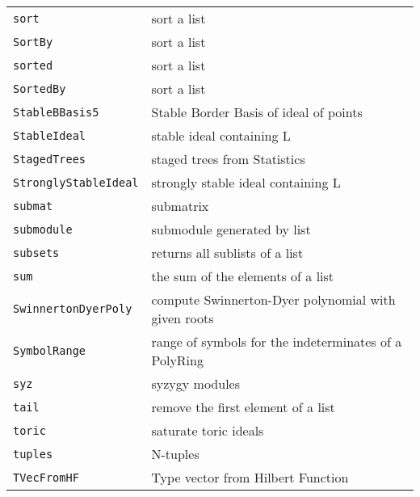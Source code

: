 \documentclass[a4paper]{mybook}
\begin{document}
\begin{center}
\begin{longtable}{ll}
{\verb~sort~} &
      sort a list\\
   
{\verb~SortBy~} &
      sort a list\\
   
{\verb~sorted~} &
      sort a list\\
   
{\verb~SortedBy~} &
      sort a list\\
   
{\verb~StableBBasis5~} &
      Stable Border Basis of ideal of points\\
   
{\verb~StableIdeal~} &
      stable ideal containing L\\
   
{\verb~StagedTrees~} &
      staged trees from Statistics\\
   
{\verb~StronglyStableIdeal~} &
      strongly stable ideal containing L\\
   
{\verb~submat~} &
      submatrix\\
   
{\verb~submodule~} &
      submodule generated by list\\
   
{\verb~subsets~} &
      returns all sublists of a list\\
   
{\verb~sum~} &
      the sum of the elements of a list\\
   
{\verb~SwinnertonDyerPoly~} &
      compute Swinnerton-Dyer polynomial with given roots\\
   
{\verb~SymbolRange~} &
      range of symbols for the indeterminates of a PolyRing\\
   
{\verb~syz~} &
      syzygy modules\\
   
{\verb~tail~} &
      remove the first element of a list\\
   
{\verb~toric~} &
      saturate toric ideals\\
   
{\verb~tuples~} &
      N-tuples\\
   
{\verb~TVecFromHF~} &
      Type vector from Hilbert Function\\
   

\end{longtable}
\end{center}
\end{document}
